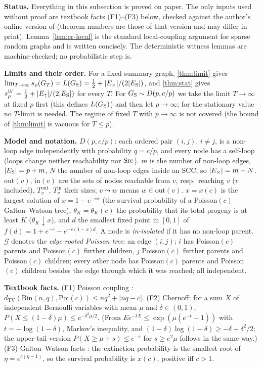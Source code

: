 \textbf{Status.} Everything in this subsection is proved on paper. The only
inputs used without proof are textbook facts (F1)--(F3) below, checked against
the author's online version of \citet{hofstad2016random} (theorem numbers are
those of that version and may differ in print). Lemma~\ref{lem:er-local} is the
standard local-coupling argument for sparse random graphs and is written
concisely. The deterministic witness lemmas are machine-checked; no
probabilistic step is.

\textbf{Limits and their order.} For a fixed summary graph, \cref{thm:limit}
gives $\lim_{T\to\infty}s_\rho(G_T)=L(G_{\mathrm S})=\tfrac12+|E_{\times}|/(2|E_{\mathrm S}|)$, and
\cref{thm:stat} gives $s_\rho^W=\tfrac12+|E_{\uparrow}|/(2|E_{\mathrm S}|)$ for every $T$. For
$G_{\mathrm S}\sim D(p,c/p)$ we take the limit $T\to\infty$ at fixed $p$ first (this
defines $L(G_{\mathrm S})$) and then let $p\to\infty$; for the stationary value no
$T$-limit is needed. The regime of fixed $T$ with $p\to\infty$ is not covered
(the bound of \cref{thm:limit} is vacuous for $T\le p$).

\textbf{Model and notation.} $D(p,c/p)$: each ordered pair $(i,j)$, $i\ne j$,
is a non-loop edge independently with probability $q=c/p$, and every node has
a self-loop (loops change neither reachability nor $\mathrm{Src}$). $m$ is the number of
non-loop edges, $|E_{\mathrm S}|=p+m$, $N$ the number of non-loop edges inside an SCC, so
$|E_{\times}|=m-N$. $\mathrm{out}(v)$, $\mathrm{in}(v)$ are the sets of nodes
reachable from $v$, resp.\ reaching $v$ ($v$ included), $T^{\mathrm{out}}_v$,
$T^{\mathrm{in}}_v$ their sizes; $v\leadsto w$ means $w\in\mathrm{out}(v)$.
$x=x(c)$ is the largest solution of $x=1-e^{-cx}$ (the survival probability of
a Poisson$(c)$ Galton--Watson tree), $\theta_K=\theta_K(c)$ the probability that
its total progeny is at least $K$ ($\theta_K\downarrow x$), and $d$ the smallest
fixed point in $[0,1]$ of $f(d)=1+e^{-c}-e^{-c(1-x)d}$. A node is
\emph{in-isolated} if it has no non-loop parent. $\mathcal G$ denotes the
\emph{edge-rooted Poisson tree}: an edge $(i,j)$; $i$ has Poisson$(c)$ parents
and Poisson$(c)$ further children, $j$ Poisson$(c)$ further parents and
Poisson$(c)$ children; every other node has Poisson$(c)$ parents and
Poisson$(c)$ children besides the edge through which it was reached; all
independent.

\textbf{Textbook facts.} (F1) Poisson coupling \citep[Thm.~2.10]{hofstad2016random}:
$d_{\mathrm{TV}}(\mathrm{Bin}(n,q),\mathrm{Poi}(c))\le nq^2+|nq-c|$.
(F2) Chernoff: for a sum $X$ of independent Bernoulli variables with mean
$\mu$ and $\delta\in(0,1)$, $P(X\le(1-\delta)\mu)\le e^{-\delta^2\mu/2}$. (From
$Ee^{-tX}\le\exp(\mu(e^{-t}-1))$ with $t=-\log(1-\delta)$, Markov's inequality,
and $(1-\delta)\log(1-\delta)\ge-\delta+\delta^2/2$; the upper-tail version
$P(X\ge\mu+s)\le e^{-s}$ for $s\ge e^2\mu$ follows in the same way.)
(F3) Galton--Watson facts \citep[Thms.~3.1, 3.16]{hofstad2016random}: the
extinction probability is the smallest root of $\eta=e^{c(\eta-1)}$, so the
survival probability is $x(c)$, positive iff $c>1$.

